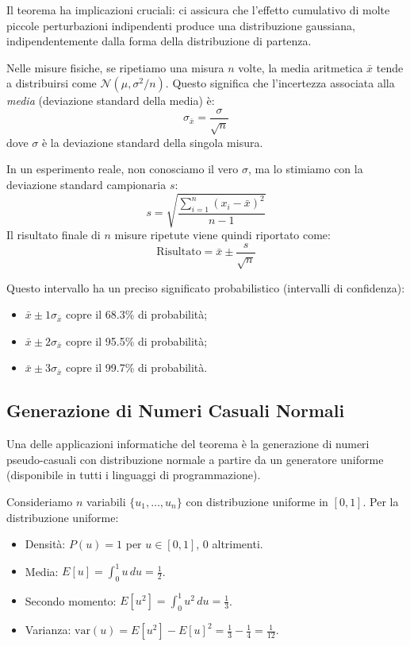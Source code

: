 \documentclass[openany,a4paper,12pt]{book}
\theoremstyle{remark}
\begin{document}
Il teorema ha implicazioni cruciali: ci assicura che l'effetto cumulativo di molte piccole perturbazioni indipendenti produce una distribuzione gaussiana, indipendentemente dalla forma della distribuzione di partenza.

Nelle misure fisiche, se ripetiamo una misura $n$ volte, la media aritmetica $\bar{x}$ tende a distribuirsi come $\mathcal{N}(\mu, \sigma^2/n)$. Questo significa che l'incertezza associata alla \textit{media} (deviazione standard della media) è:
\begin{equation}
\sigma_{\bar{x}} = \frac{\sigma}{\sqrt{n}}
\end{equation}
dove $\sigma$ è la deviazione standard della singola misura.

In un esperimento reale, non conosciamo il vero $\sigma$, ma lo stimiamo con la deviazione standard campionaria $s$:
\[
s = \sqrt{\frac{\sum_{i=1}^{n} (x_i-\bar{x})^2}{n-1}}
\]
Il risultato finale di $n$ misure ripetute viene quindi riportato come:
\begin{equation}
\text{Risultato} = \bar{x} \pm \frac{s}{\sqrt{n}}
\end{equation}

Questo intervallo ha un preciso significato probabilistico (intervalli di confidenza):
\begin{itemize}
    \item $\bar{x} \pm 1\sigma_{\bar{x}}$ copre il 68.3\% di probabilità;
    \item $\bar{x} \pm 2\sigma_{\bar{x}}$ copre il 95.5\% di probabilità;
    \item $\bar{x} \pm 3\sigma_{\bar{x}}$ copre il 99.7\% di probabilità.
\end{itemize}

\subsection{Generazione di Numeri Casuali Normali}

Una delle applicazioni informatiche del teorema è la generazione di numeri pseudo-casuali con distribuzione normale a partire da un generatore uniforme (disponibile in tutti i linguaggi di programmazione).

Consideriamo $n$ variabili $\{u_1, \dots, u_n\}$ con distribuzione uniforme in $[0, 1]$.
Per la distribuzione uniforme:
\begin{itemize}
    \item Densità: $P(u) = 1$ per $u \in [0,1]$, $0$ altrimenti.
    \item Media: $E[u] = \int_0^1 u \, du = \frac{1}{2}$.
    \item Secondo momento: $E[u^2] = \int_0^1 u^2 \, du = \frac{1}{3}$.
    \item Varianza: $\text{var}(u) = E[u^2] - E[u]^2 = \frac{1}{3} - \frac{1}{4} = \frac{1}{12}$.
\end{itemize}
\end{document}

